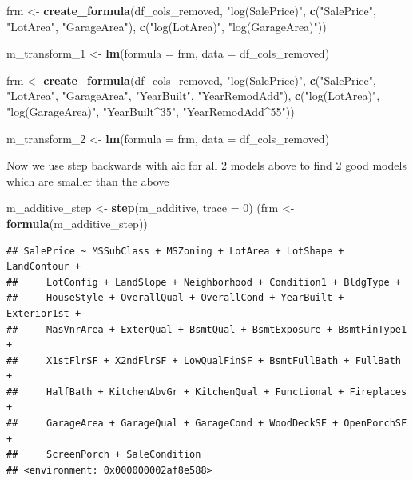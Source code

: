 \documentclass[
]{article}
\newenvironment{Shaded}{\begin{snugshade}}{\end{snugshade}}
\newcommand{\DataTypeTok}[1]{\textcolor[rgb]{0.13,0.29,0.53}{#1}}
\newcommand{\DecValTok}[1]{\textcolor[rgb]{0.00,0.00,0.81}{#1}}
\newcommand{\KeywordTok}[1]{\textcolor[rgb]{0.13,0.29,0.53}{\textbf{#1}}}
\newcommand{\NormalTok}[1]{#1}
\newcommand{\StringTok}[1]{\textcolor[rgb]{0.31,0.60,0.02}{#1}}
\begin{document}
\begin{Shaded}
\begin{Highlighting}[]
\NormalTok{frm <-}\StringTok{ }\KeywordTok{create_formula}\NormalTok{(df_cols_removed, }\StringTok{"log(SalePrice)"}\NormalTok{, }\KeywordTok{c}\NormalTok{(}\StringTok{"SalePrice"}\NormalTok{, }\StringTok{"LotArea"}\NormalTok{, }\StringTok{"GarageArea"}\NormalTok{), }\KeywordTok{c}\NormalTok{(}\StringTok{"log(LotArea)"}\NormalTok{, }\StringTok{"log(GarageArea)"}\NormalTok{))}

\NormalTok{m_transform_}\DecValTok{1}\NormalTok{ <-}\StringTok{ }\KeywordTok{lm}\NormalTok{(}\DataTypeTok{formula =}\NormalTok{ frm, }\DataTypeTok{data =}\NormalTok{ df_cols_removed)}
\end{Highlighting}
\end{Shaded}

\begin{Shaded}
\begin{Highlighting}[]
\NormalTok{frm <-}\StringTok{ }\KeywordTok{create_formula}\NormalTok{(df_cols_removed, }\StringTok{"log(SalePrice)"}\NormalTok{, }\KeywordTok{c}\NormalTok{(}\StringTok{"SalePrice"}\NormalTok{, }\StringTok{"LotArea"}\NormalTok{, }\StringTok{"GarageArea"}\NormalTok{, }\StringTok{"YearBuilt"}\NormalTok{, }\StringTok{"YearRemodAdd"}\NormalTok{), }\KeywordTok{c}\NormalTok{(}\StringTok{"log(LotArea)"}\NormalTok{, }\StringTok{"log(GarageArea)"}\NormalTok{, }\StringTok{"YearBuilt^35"}\NormalTok{, }\StringTok{"YearRemodAdd^55"}\NormalTok{))}

\NormalTok{m_transform_}\DecValTok{2}\NormalTok{ <-}\StringTok{ }\KeywordTok{lm}\NormalTok{(}\DataTypeTok{formula =}\NormalTok{ frm, }\DataTypeTok{data =}\NormalTok{ df_cols_removed)}
\end{Highlighting}
\end{Shaded}

Now we use step backwards with aic for all 2 models above to find 2 good models which are smaller than the above

\begin{Shaded}
\begin{Highlighting}[]
\NormalTok{m_additive_step <-}\StringTok{ }\KeywordTok{step}\NormalTok{(m_additive, }\DataTypeTok{trace =} \DecValTok{0}\NormalTok{)}
\NormalTok{(frm <-}\StringTok{ }\KeywordTok{formula}\NormalTok{(m_additive_step))}
\end{Highlighting}
\end{Shaded}

\begin{verbatim}
## SalePrice ~ MSSubClass + MSZoning + LotArea + LotShape + LandContour + 
##     LotConfig + LandSlope + Neighborhood + Condition1 + BldgType + 
##     HouseStyle + OverallQual + OverallCond + YearBuilt + Exterior1st + 
##     MasVnrArea + ExterQual + BsmtQual + BsmtExposure + BsmtFinType1 + 
##     X1stFlrSF + X2ndFlrSF + LowQualFinSF + BsmtFullBath + FullBath + 
##     HalfBath + KitchenAbvGr + KitchenQual + Functional + Fireplaces + 
##     GarageArea + GarageQual + GarageCond + WoodDeckSF + OpenPorchSF + 
##     ScreenPorch + SaleCondition
## <environment: 0x000000002af8e588>
\end{verbatim}
\end{document}
